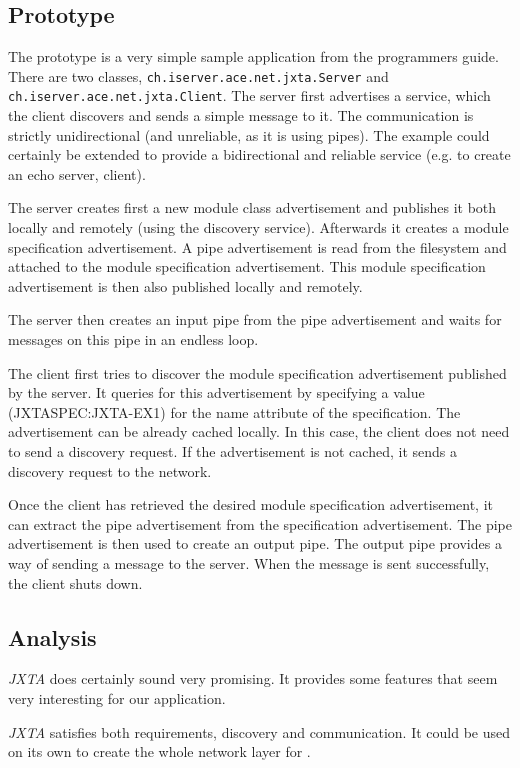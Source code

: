 \subsection{Prototype}
The prototype is a very simple sample application from the programmers guide. There are two classes, \texttt{ch.iserver.ace.net.jxta.Server} and \texttt{ch.iserver.ace.net.jxta.Client}. The server first advertises a service, which the client discovers and sends a simple message to it. The communication is strictly unidirectional (and unreliable, as it is using pipes). The example could certainly be extended to provide a bidirectional and reliable service (e.g. to create an echo server, client).

The server creates first a new module class advertisement and publishes it both locally and remotely (using the discovery service). Afterwards it creates a module specification advertisement. A pipe advertisement is read from the filesystem and attached to the module specification advertisement. This module specification advertisement is then also published locally and remotely.

The server then creates an input pipe from the pipe advertisement and waits for messages on this pipe in an endless loop.

The client first tries to discover the module specification advertisement published by the server. It queries for this advertisement by specifying a value (JXTASPEC:JXTA-EX1) for the name attribute of the specification. The advertisement can be already cached locally. In this case, the client does not need to send a discovery request. If the advertisement is not cached, it sends a discovery request to the network.

Once the client has retrieved the desired module specification advertisement, it can extract the pipe advertisement from the specification advertisement. The pipe advertisement is then used to create an output pipe. The output pipe provides a way of sending a message to the server. When the message is sent successfully, the client shuts down.



\subsection{Analysis}
\emph{JXTA} does certainly sound very promising. It provides some features that seem very interesting for our application. 

\emph{JXTA} satisfies both requirements, discovery and communication. It could be used on its own to create the whole network layer for \ace.

